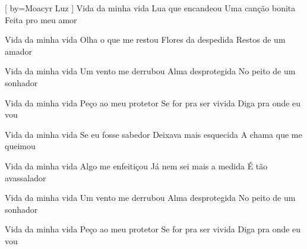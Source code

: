 [
    by={Moacyr Luz}
]
\beginverse
Vida da minha vida
Lua que encandeou
Uma canção bonita
Feita pro meu amor

Vida da minha vida
Olha o que me restou
Flores da despedida
Restos de um amador

Vida da minha vida
Um vento me derrubou
Alma desprotegida
No peito de um sonhador

Vida da minha vida
Peço ao meu protetor
Se for pra ser vivida
Diga pra onde eu vou
\endverse

\beginverse
Vida da minha vida
Se eu fosse sabedor
Deixava mais esquecida
A chama que me queimou

Vida da minha vida
Algo me enfeitiçou
Já nem sei mais a medida
É tão avassalador

Vida da minha vida
Um vento me derrubou
Alma desprotegida
No peito de um sonhador

Vida da minha vida
Peço ao meu protetor
Se for pra ser vivida
Diga pra onde eu vou
\endverse

\endsong
